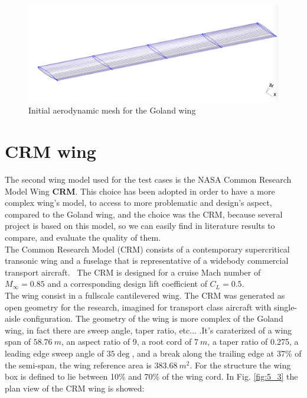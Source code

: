 \begin{figure}[H]
\centering
\includegraphics[width = 1\textwidth]{./Immagini/5_2.png}
\caption{Initial aerodynamic mesh for the Goland wing}
\label{fig:5_2}
\end{figure}

\section{CRM wing}
The second wing model used for the test cases is the NASA Common Research Model Wing \textbf{CRM}. This choice has been adopted in order to have a more complex wing's model, to access to more problematic and design's aspect, compared to the Goland wing, and the choice was the CRM, because several project is based on this model, so we can easily find in literature results to compare, and evaluate the quality of them.\\
The Common Research Model (CRM) consists of a contemporary supercritical transonic wing and a fuselage that is representative of a widebody commercial transport aircraft.  The CRM is designed for a cruise Mach number of $M_{\infty} = 0.85$ and a corresponding design lift coefficient of $C_L= 0.5$. \cite{nasa2}\\
The wing consist in a fullscale cantilevered wing. The CRM was generated as open geometry for the research, imagined for transport class aircraft with single-aisle configuration. The geometry of the wing is more complex of the Goland wing, in fact there are sweep angle, taper ratio, etc... .It's caraterized of a wing span of $58.76 \ m$, an aspect ratio of 9, a root cord of $7\ m$, a taper ratio of 0.275, a leading edge sweep angle of $35 \deg$, and a break along the trailing edge at 37\% of the semi-span, the wing reference area is $ 383.68\  m^2$. For the structure the wing box is defined to lie between 10\% and 70\% of the wing cord. 
\newpage
In Fig. \ref{fig:5_3} the plan view of the CRM wing is showed:
